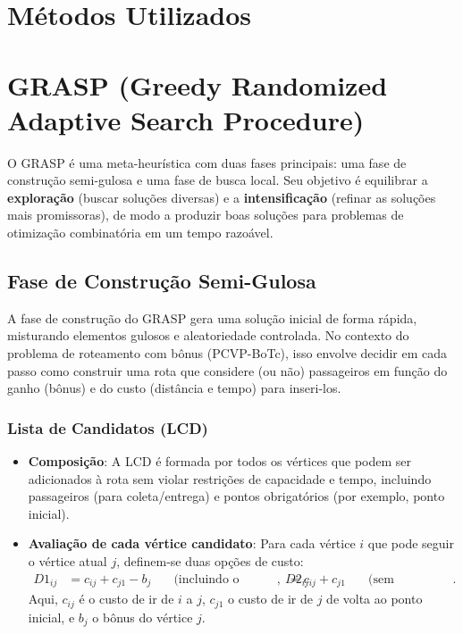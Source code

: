 \documentclass[12pt, a4paper]{report}
\begin{document}
\section{Métodos Utilizados}

\section*{GRASP (Greedy Randomized Adaptive Search Procedure)}
O GRASP é uma meta-heurística com duas fases principais: uma fase de construção semi-gulosa e uma fase de busca local. Seu objetivo é equilibrar a \textbf{exploração} (buscar soluções diversas) e a \textbf{intensificação} (refinar as soluções mais promissoras), de modo a produzir boas soluções para problemas de otimização combinatória em um tempo razoável.

\subsection*{Fase de Construção Semi-Gulosa}

A fase de construção do GRASP gera uma solução inicial de forma rápida, misturando elementos gulosos e aleatoriedade controlada. No contexto do problema de roteamento com bônus (PCVP-BoTc), isso envolve decidir em cada passo como construir uma rota que considere (ou não) passageiros em função do ganho (bônus) e do custo (distância e tempo) para inseri-los.

\subsubsection*{Lista de Candidatos (LCD)}
\begin{itemize}
\item \textbf{Composição}: A LCD é formada por todos os vértices que podem ser adicionados à rota sem violar restrições de capacidade e tempo, incluindo passageiros (para coleta/entrega) e pontos obrigatórios (por exemplo, ponto inicial).
\item \textbf{Avaliação de cada vértice candidato}: Para cada vértice $i$ que pode seguir o vértice atual $j$, definem-se duas opções de custo:
\begin{align*}
D1_{ij} &= c_{ij} + c_{j1} - b_j \quad &\text{(incluindo o bônus)},\
D2_{ij} &= c_{ij} + c_{j1} \quad &\text{(sem considerar o bônus)}.
\end{align*}
Aqui, $c_{ij}$ é o custo de ir de $i$ a $j$, $c_{j1}$ o custo de ir de $j$ de volta ao ponto inicial, e $b_j$ o bônus do vértice $j$.
\end{itemize}
\end{document}
